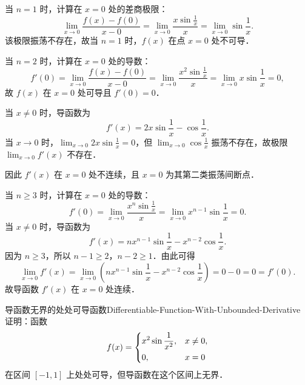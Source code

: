 \begin{myproof}

    当 $n = 1$ 时，计算在 $x = 0$ 处的差商极限：
    \begin{equation}
        \lim_{x\to 0} \frac{f(x) - f(0)}{x - 0} = \lim_{x\to 0} \frac{x\sin \frac{1}{x}}{x} = \lim_{x\to 0} \sin \frac{1}{x}.
    \end{equation}
    该极限振荡不存在，故当 $n = 1$ 时，$f(x)$ 在点 $x = 0$ 处不可导．


    当 $n = 2$ 时，计算在 $x = 0$ 处的导数：
    \begin{equation}
        f'(0) = \lim_{x\to 0} \frac{f(x) - f(0)}{x - 0} = \lim_{x\to 0} \frac{x^2\sin \frac{1}{x}}{x} = \lim_{x\to 0} x\sin \frac{1}{x} = 0,
    \end{equation}
    故 $f(x)$ 在 $x = 0$ 处可导且 $f'(0) = 0$．

    当 $x \neq 0$ 时，导函数为
    \begin{equation}
        f'(x) = 2x\sin \frac{1}{x} - \cos \frac{1}{x}.
    \end{equation}
    当 $x \to 0$ 时，$\lim_{x\to 0} 2x\sin \frac{1}{x} = 0$，但 $\lim_{x\to 0} \cos \frac{1}{x}$ 振荡不存在，故极限 $\lim_{x\to 0} f'(x)$ 不存在．

    因此 $f'(x)$ 在 $x = 0$ 处不连续，且 $x = 0$ 为其第二类振荡间断点．


    当 $n \geqslant 3$ 时，计算在 $x = 0$ 处的导数：
    \begin{equation}
        f'(0) = \lim_{x\to 0} \frac{x^n \sin \frac{1}{x}}{x} = \lim_{x\to 0} x^{n-1} \sin \frac{1}{x} = 0.
    \end{equation}
    当 $x \neq 0$ 时，导函数为
    \begin{equation}
        f'(x) = n x^{n-1} \sin \frac{1}{x} - x^{n-2} \cos \frac{1}{x}.
    \end{equation}
    因为 $n \geqslant 3$，所以 $n - 1 \geqslant 2$，$n - 2 \geqslant 1$．由此可得
    \begin{equation}
        \lim_{x\to 0} f'(x) = \lim_{x\to 0} \left( n x^{n-1} \sin \frac{1}{x} - x^{n-2} \cos \frac{1}{x} \right) = 0 - 0 = 0 = f'(0).
    \end{equation}
    故导函数 $f'(x)$ 在 $x = 0$ 处连续．
\end{myproof}

\begin{problem}{导函数无界的处处可导函数}{Differentiable-Function-With-Unbounded-Derivative}
    证明：函数
    \begin{equation}
        f(x) = \begin{dcases} x^2 \sin \frac{1}{x^2}, & x \neq 0, \\ 0, & x = 0 \end{dcases}
    \end{equation}
    在区间 $[-1, 1]$ 上处处可导，但导函数在这个区间上无界．
\end{problem}

